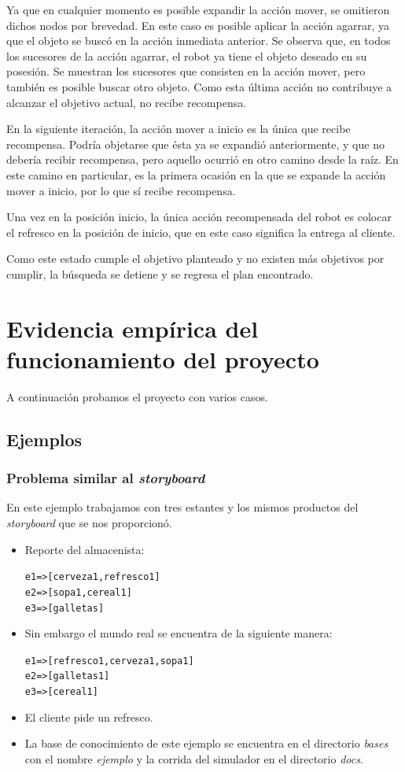 \documentclass[11pt]{article}
\newcommand{\bt}{\begin{alltt}}
\newcommand{\et}{\end{alltt}}
\begin{document}
Ya que en cualquier momento es posible expandir la acción mover, se omitieron dichos nodos por brevedad. En este caso es posible aplicar la acción agarrar, ya que el objeto se buscó en la acción inmediata anterior. Se observa que, en todos los sucesores de la acción agarrar, el robot ya tiene el objeto deseado en su posesión. Se muestran los sucesores que consisten en la acción mover, pero también es posible buscar otro objeto. Como esta última acción no contribuye a alcanzar el objetivo actual, no recibe recompensa.

En la siguiente iteración, la acción mover a inicio es la única que recibe recompensa. Podría objetarse que ésta ya se expandió anteriormente, y que no debería recibir recompensa, pero aquello ocurrió en otro camino desde la raíz. En este camino en particular, es la primera ocasión en la que se expande la acción mover a inicio, por lo que sí recibe recompensa.

Una vez en la posición inicio, la única acción recompensada del robot es colocar el refresco en la posición de inicio, que en este caso significa la entrega al cliente.

Como este estado cumple el objetivo planteado y no existen más objetivos por cumplir, la búsqueda se detiene y se regresa el plan encontrado.

\section{Evidencia empírica del funcionamiento del proyecto}

A continuación probamos el proyecto con varios casos.

\subsection{Ejemplos}

\subsubsection{Problema similar al \emph{storyboard}}

En este ejemplo trabajamos con tres estantes y los mismos
productos del \emph{storyboard} que se nos proporcionó.

\begin{itemize}
\item Reporte del almacenista:
  \bt
  e1 => [cerveza1,refresco1]
  e2 => [sopa1,cereal1]
  e3 => [galletas]
  \et
\item Sin embargo el mundo real se encuentra de la siguiente manera:
  \bt
  e1 => [refresco1,cerveza1,sopa1]
  e2 => [galletas1]
  e3 => [cereal1]
  \et
\item El cliente pide un refresco.
\item La base de conocimiento de este ejemplo se encuentra
  en el directorio \emph{bases} con el nombre \emph{ejemplo}  y la corrida del simulador
  en el directorio \emph{docs}.
\end{itemize}
\end{document}
